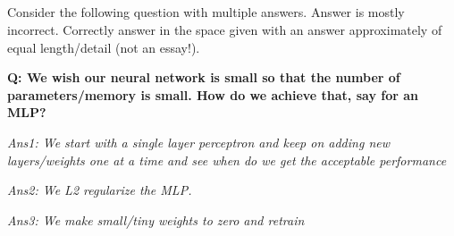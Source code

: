 \begin{frame}
\section{}
Consider the following question with multiple answers. Answer is mostly incorrect. Correctly answer in the space given with an answer approximately of equal length/detail (not an essay!).

{\bf Q: We wish our neural network is small so that the number of parameters/memory is small. How do we achieve that, say for an MLP?}

{\em Ans1: We start with a single layer perceptron and keep on adding new layers/weights one at a time and see when do we get the acceptable performance}

{\em Ans2: We L2 regularize the MLP.}

{\em Ans3: We make small/tiny weights to zero and retrain}

\end{frame}
